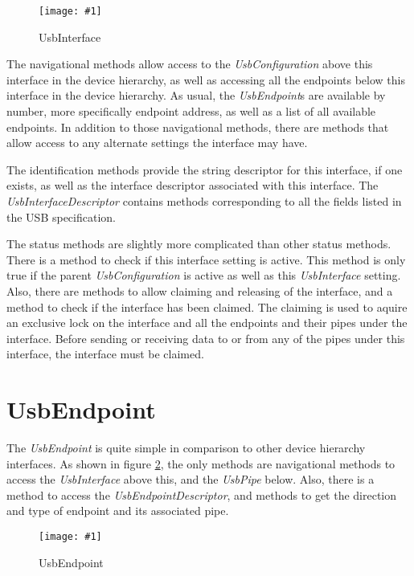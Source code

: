 \documentclass{article}
\newcommand{\myinterface}[1]{\emph{#1}}
\newcommand{\mysectionend}[0]{\vfill\pagebreak[1]}
\newcommand{\myfigure}[3]{\begin{figure}[htbp]\centering\texttt{[image: \#1]}\caption{#2}\label{#3}\end{figure}}
\begin{document}
\myfigure{figs/UsbInterface}{UsbInterface}{UsbInterface}

The navigational methods allow access to the \myinterface{UsbConfiguration} above this
interface in the device hierarchy, as well as accessing all the
endpoints below this interface in the device hierarchy.  As usual, the
\myinterface{UsbEndpoint}s are available by number, more specifically endpoint address,
as well as a list of all available endpoints.  In addition to those
navigational methods, there are methods that allow access to any alternate
settings the interface may have.

The identification methods provide the string descriptor for this interface,
if one exists, as well as the interface descriptor associated with this interface.
The \myinterface{UsbInterfaceDescriptor} contains methods corresponding to all the fields
listed in the USB specification.

The status methods are slightly more complicated than other status methods.
There is a method to check if this interface setting is active.  This
method is only true if the parent \myinterface{UsbConfiguration} is active as well as
this \myinterface{UsbInterface} setting.  Also, there are methods to allow claiming
and releasing of the interface, and a method to check if the interface
has been claimed.  The claiming is used to aquire an exclusive lock
on the interface and all the endpoints and their pipes under the interface.
Before sending or receiving data to or from any of the pipes under
this interface, the interface must be claimed.

\mysectionend

%

\section{UsbEndpoint}

The \myinterface{UsbEndpoint} is quite simple in comparison to other device hierarchy
interfaces.  As shown in figure \ref{UsbEndpoint}, the only methods are
navigational methods to access the \myinterface{UsbInterface} above this, and the
\myinterface{UsbPipe} below.  Also, there is a method to access the \myinterface{UsbEndpointDescriptor},
and methods to get the direction and type of endpoint and its associated
pipe.

\myfigure{figs/UsbEndpoint}{UsbEndpoint}{UsbEndpoint}

\mysectionend
\end{document}
